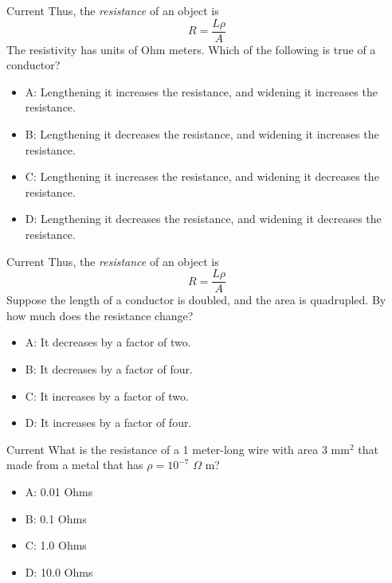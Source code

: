 \documentclass{beamer}
\begin{document}
\begin{frame}{Current}
Thus, the \textit{resistance} of an object is 
\begin{equation}
R = \frac{L \rho}{A}
\end{equation}
The resistivity has units of Ohm meters.  Which of the following is true of a conductor?
\begin{itemize}
\item A: Lengthening it increases the resistance, and widening it increases the resistance.
\item B: Lengthening it decreases the resistance, and widening it increases the resistance.
\item C: Lengthening it increases the resistance, and widening it decreases the resistance.
\item D: Lengthening it decreases the resistance, and widening it decreases the resistance.
\end{itemize}
\end{frame}

\begin{frame}{Current}
Thus, the \textit{resistance} of an object is 
\begin{equation}
R = \frac{L \rho}{A}
\end{equation}
Suppose the length of a conductor is doubled, and the area is quadrupled.  By how much does the resistance change?
\begin{itemize}
\item A: It decreases by a factor of two.
\item B: It decreases by a factor of four.
\item C: It increases by a factor of two.
\item D: It increases by a factor of four.
\end{itemize}
\end{frame}

\begin{frame}{Current}
What is the resistance of a 1 meter-long wire with area 3 mm$^2$ that made from a metal that has $\rho = 10^{-7}$ $\Omega$ m?
\begin{itemize}
\item A: 0.01 Ohms
\item B: 0.1 Ohms
\item C: 1.0 Ohms
\item D: 10.0 Ohms
\end{itemize}
\end{frame}
\end{document}
